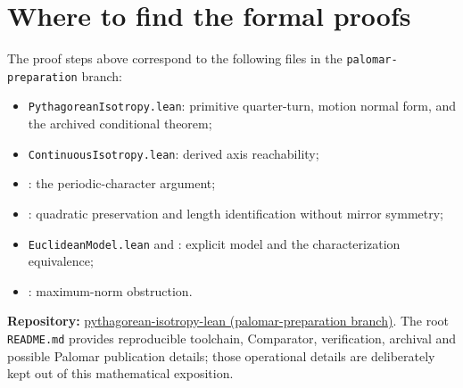 \documentclass[11pt,a4paper]{article}
\begin{document}
\section{Where to find the formal proofs}

The proof steps above correspond to the following
files in the \texttt{palomar-preparation} branch:
\begin{itemize}
 \item \texttt{PythagoreanIsotropy.lean}: primitive quarter-turn,
       motion normal form, and the archived conditional theorem;
 \item \texttt{ContinuousIsotropy.lean}: derived axis
       reachability;
 \item {}: the periodic-character
       argument;
 \item {}: quadratic preservation
       and length identification without mirror symmetry;
 \item \texttt{EuclideanModel.lean} and
       : explicit model
       and the characterization equivalence;
 \item {}: maximum-norm
       obstruction.
\end{itemize}
\noindent\textbf{Repository:}
\href{https://github.com/alexodas/pythagorean-isotropy-lean/tree/palomar-preparation}{pythagorean-isotropy-lean (palomar-preparation branch)}.
The root \texttt{README.md} provides reproducible toolchain,
Comparator, verification, archival and possible Palomar
publication details; those operational details are deliberately
kept out of this mathematical exposition.
\end{document}
